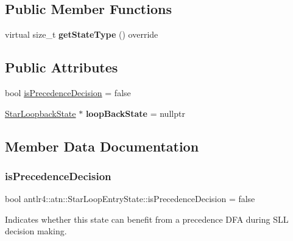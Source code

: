 \subsection*{Public Member Functions}
\begin{DoxyCompactItemize}
\item 
\mbox{\label{classantlr4_1_1atn_1_1StarLoopEntryState_a7320385e8230d2fe5e07387c13bb1901}} 
virtual size\+\_\+t {\bfseries get\+State\+Type} () override
\end{DoxyCompactItemize}
\subsection*{Public Attributes}
\begin{DoxyCompactItemize}
\item 
bool \hyperlink{classantlr4_1_1atn_1_1StarLoopEntryState_ab82b43062e5c0fc36eaf378dc95395ac}{is\+Precedence\+Decision} = false
\item 
\mbox{\label{classantlr4_1_1atn_1_1StarLoopEntryState_a279d6744e048e3ea74a0086307f0bf9f}} 
\hyperlink{classantlr4_1_1atn_1_1StarLoopbackState}{Star\+Loopback\+State} $\ast$ {\bfseries loop\+Back\+State} = nullptr
\end{DoxyCompactItemize}


\subsection{Member Data Documentation}
\mbox{\label{classantlr4_1_1atn_1_1StarLoopEntryState_ab82b43062e5c0fc36eaf378dc95395ac}} 
\subsubsection{\texorpdfstring{is\+Precedence\+Decision}{isPrecedenceDecision}}
{\footnotesize\ttfamily bool antlr4\+::atn\+::\+Star\+Loop\+Entry\+State\+::is\+Precedence\+Decision = false}

Indicates whether this state can benefit from a precedence D\+FA during S\+LL decision making.

